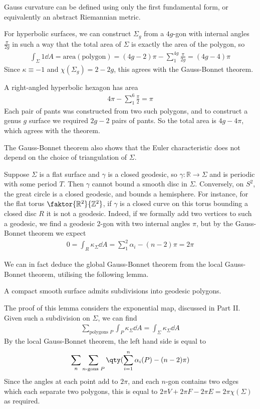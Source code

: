 \begin{remark}
	Gauss curvature can be defined using only the first fundamental form, or equivalently an abstract Riemannian metric.

	For hyperbolic surfaces, we can construct $\Sigma_g$ from a $4g$-gon with internal angles $\frac{\pi}{2g}$ in such a way that the total area of $\Sigma$ is exactly the area of the polygon, so
	\begin{align*}
		\int_\Sigma 1 \dd{A} = \mathrm{area}(\mathrm{polygon}) = (4g-2)\pi - \sum_{1}^{4g} \frac{\pi}{2g} = (4g-4)\pi
	\end{align*}
	Since $\kappa \equiv -1$ and $\chi(\Sigma_g) = 2-2g$, this agrees with the Gauss-Bonnet theorem.

	A right-angled hyperbolic hexagon has area
	\begin{align*}
		4\pi - \sum_{1}^6 \frac{\pi}{2} = \pi
	\end{align*}
	Each pair of pants was constructed from two such polygons, and to construct a genus $g$ surface we required $2g-2$ pairs of pants.
	So the total area is $4g-4\pi$, which agrees with the theorem.

	The Gauss-Bonnet theorem also shows that the Euler characteristic does not depend on the choice of triangulation of $\Sigma$.

	Suppose $\Sigma$ is a flat surface and $\gamma$ is a closed geodesic, so $\gamma \colon \mathbb R \to \Sigma$ and is periodic with some period $T$.
	Then $\gamma$ cannot bound a smooth disc in $\Sigma$.
	Conversely, on $S^2$, the great circle is a closed geodesic, and bounds a hemisphere.
	For instance, for the flat torus $\faktor{\mathbb R^2}{\mathbb Z^2}$, if $\gamma$ is a closed curve on this torus bounding a closed disc $R$ it is not a geodesic.
	Indeed, if we formally add two vertices to such a geodesic, we find a geodesic 2-gon with two internal angles $\pi$, but by the Gauss-Bonnet theorem we expect
	\begin{align*}
		0 = \int_R \kappa_\Sigma \dd{A} = \sum_1^2 \alpha_i - (n-2)\pi = 2\pi
	\end{align*}
\end{remark}
We can in fact deduce the global Gauss-Bonnet theorem from the local Gauss-Bonnet theorem, utilising the following lemma.
\begin{lemma}
	A compact smooth surface admits subdivisions into geodesic polygons.
\end{lemma}
The proof of this lemma considers the exponential map, discussed in Part II.
Given such a subdivision on $\Sigma$, we can find
\begin{align*}
	\sum_{\text{polygons } P} \int_P \kappa_\Sigma \dd{A} = \int_\Sigma \kappa_\Sigma \dd{A}
\end{align*}
By the local Gauss-Bonnet theorem, the left hand side is equal to
\begin{align*}
	\sum_n \sum_{n\text{-gons } P} \qty(\sum_{i=1}^n \alpha_i(P) - (n-2)\pi)
\end{align*}
Since the angles at each point add to $2\pi$, and each $n$-gon contains two edges which each separate two polygons, this is equal to $2\pi V + 2 \pi F - 2\pi E = 2\pi\chi(\Sigma)$ as required.

